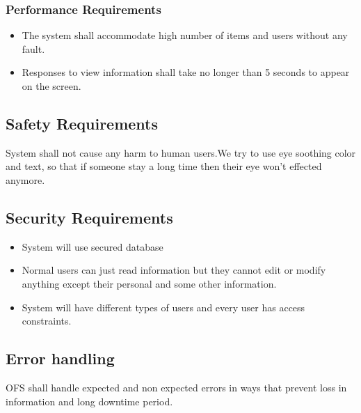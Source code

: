 \documentclass{article}
\begin{document}
\subsubsection{Performance Requirements}
\begin{itemize}
\item The system shall accommodate high number of items and users without any fault.
\item Responses to view information shall take no longer than 5 seconds to appear on the screen.
\end{itemize}
\subsection{Safety Requirements} System shall not cause any harm to human users.We try to use eye soothing color and text, so that if someone stay a long time then their eye won't effected anymore.
\subsection{Security Requirements}
\begin{itemize}
\item System will use secured database
\item Normal users can just read information but they cannot edit or modify anything except their personal and some other information.
\item System will have different types of users and every user has access constraints.
\end{itemize}
\subsection{Error handling}
OFS shall handle expected and non expected errors in ways that prevent loss in information and long downtime period.
\end{document}
